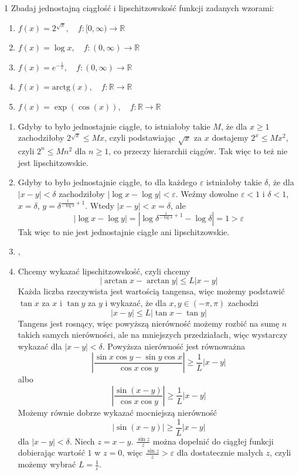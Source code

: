 \documentclass{../note}
\begin{document}
\begin{zadanie}{1}
Zbadaj jednostajną ciągłość i lipschitzowskość funkcji zadanych wzorami:
\begin{enumerate}
    \item[(a)] $f(x)=2^{\sqrt{x}}, \quad f:[0,\infty)\rightarrow\mathbb{R}$
    \item[(b)] $f(x)=\log x, \quad f:(0,\infty)\rightarrow\mathbb{R}$
    \item[(c)] $f(x)=e^{-\frac{1}{x}}, \quad f:(0,\infty)\rightarrow\mathbb{R}$
    \item[(d)] $f(x)=\text{arctg}(x), \quad f:\mathbb{R}\rightarrow\mathbb{R}$
    \item[(e)] $f(x)=\exp(\cos(x)), \quad f:\mathbb{R}\rightarrow\mathbb{R}$
\end{enumerate}
\end{zadanie}
\begin{rozwiazanie}
\begin{enumerate}[label=(\alph*)]
    \item Gdyby to było jednostajnie ciągłe, to istniałoby takie $M$, że dla $x \geq 1$ zachodziłoby $2^{\sqrt{x}} \leq Mx$, czyli podstawiając $\sqrt{x}$ za $x$ dostajemy $2^{x} \leq Mx^2$, czyli $2^n \leq Mn^2$ dla $n \geq 1$, co przeczy hierarchii ciągów. Tak więc to też nie jest lipschitzowskie.
    \item Gdyby to było jednostajnie ciągłe, to dla każdego $\varepsilon$ istniałoby takie $\delta$, że dla $|x-y| < \delta$ zachodziłoby $|\log x - \log y| < \varepsilon$. Weźmy dowolne $\varepsilon < 1$ i $\delta < 1$, $x = \delta$, $y = \delta^{\frac{1}{-\log\delta} + 1}$. Wtedy $|x-y| < x = \delta$, ale
    \[|\log x - \log y| = |\log \delta^{\frac{1}{-\log\delta} + 1} - \log\delta| = 1 > \varepsilon \]
    Tak więc to nie jest jednostajnie ciągłe ani lipschitzowskie.
    \item ,
    \item Chcemy wykazać lipschitzowskość, czyli chcemy 
    \[|\arctan x - \arctan y| \leq L|x - y|\]
    Każda liczba rzeczywista jest wartością tangensa, więc możemy podstawić $\tan x$ za $x$ i $\tan y$ za $y$ i wykazać, że dla $x, y \in (-\pi, \pi)$ zachodzi
    \[|x - y| \leq L|\tan x - \tan y|\]
    Tangens jest rosnący, więc powyższą nierówność możemy rozbić na sumę $n$ takich samych nierówności, ale na mniejszych przedziałach, więc wystarczy wykazać dla $|x-y| < \delta$. Powyższa nierówność jest równoważna
    \[\left|\frac{\sin x \cos y - \sin y \cos x}{\cos x \cos y}\right| \geq \frac1L |x - y|\]
    albo
    \[\left|\frac{\sin (x - y)}{\cos x \cos y}\right| \geq \frac1L |x - y|\]
    Możemy równie dobrze wykazać mocniejszą nierówność
    \[|\sin (x - y)| \geq \frac1L |x - y|\]
    dla $|x-y|<\delta$. Niech $z = x - y$. $\frac{\sin z}{z}$ można dopełnić do ciągłej funkcji dobierając wartość $1$ w $z=0$, więc $\frac{\sin z}{z} > \varepsilon$ dla dostatecznie małych $z$, czyli możemy wybrać $L = \frac{1}{\varepsilon}$.

\end{enumerate}
\end{rozwiazanie}
\end{document}
